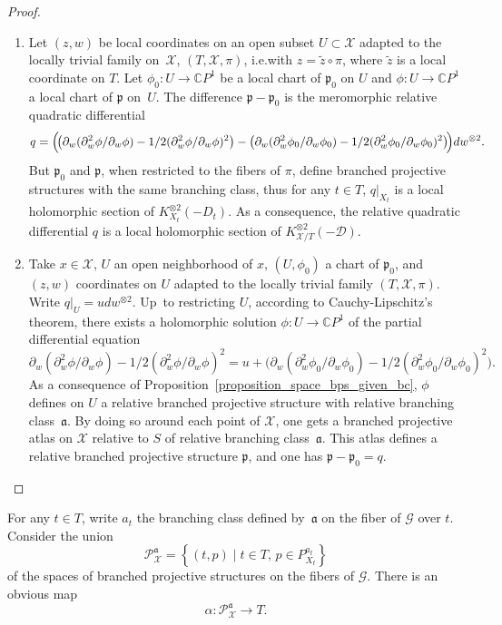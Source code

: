 \documentclass[10pt]{amsart}
\newcommand{\ie}{i.e.}
\newcommand{\skpt}{\par\smallskip}
\newcommand{\CP}{\mathbb CP}
\theoremstyle{definition}
\theoremstyle{plain}
\begin{document}
\skpt
\begin{proof}
\begin{enumerate}
\item
Let $(z, w)$ be local coordinates on an open subset $U \!\subset\! \mathcal X$ adapted to the locally trivial family on~$\mathcal X$, $(T, \mathcal X, \pi)$, \ie with $z = \widetilde z \circ \pi$, where $\widetilde z$ is a local coordinate on $T$. Let \hbox{$\phi_0: U \!\to\! \CP^1$} be a local chart of $\mathfrak p_0$ on $U$ and $\phi: U \to \CP^1$ a local chart of $\mathfrak p$ on~$U$.
The difference $\mathfrak p - \mathfrak p_0$ is the meromorphic relative quadratic differential
\[
q =\Bigl(\!\bigl(\partial_w(\partial^2_w \phi / \partial_w \phi) - 1/2 (\partial^2_w \phi / \partial_w \phi)^2\bigr)
- \bigl(\partial_w(\partial^2_w \phi_0 / \partial_w \phi_0) - 1/2 (\partial^2_w \phi_0 / \partial_w \phi_0)^2\bigr)\!\Bigr)dw^{\otimes 2}.
\]
But $\mathfrak p_0$ and $\mathfrak p$, when restricted to the fibers of $\pi$, define branched projective structures with the same branching class, thus for any $t \in T$, $q|_{X_t}$ is a local holomorphic section of $K_{X_t}^{\otimes 2}(-D_t)$. As a consequence, the relative quadratic differential $q$ is a local holomorphic section of $K_{\mathcal X / T}^{\otimes 2}(-\mathcal D)$.
\item
Take $x \in \mathcal X$, $U$ an open neighborhood of $x$, $(U, \phi_0)$ a chart of $\mathfrak p_0$, and $(z, w)$ coordinates on $U$ adapted to the locally trivial family $(T, \mathcal X, \pi)$.
Write $q|_U = udw^{\otimes 2}$. Up~to restricting $U$, according to Cauchy-Lipschitz's theorem, there exists a holomorphic solution $\phi: U\to \CP^1$ of the partial differential equation
\[
\partial_w(\partial^2_w \phi / \partial_w \phi) - 1/2 (\partial^2_w \phi / \partial_w \phi)^2 = u + \bigl(\partial_w(\partial^2_w \phi_0 / \partial_w \phi_0) - 1/2 (\partial^2_w \phi_0 / \partial_w \phi_0)^2\bigr).
\]
As a consequence of Proposition~\ref{proposition_space_bps_given_bc}, $\phi$ defines on $U$ a relative branched projective structure with relative branching class~$\mathfrak a$.
By doing so around each point of $\mathcal X$, one gets a branched projective atlas on $\mathcal X$ relative to $S$ of relative branching class~$\mathfrak a$.
This atlas defines a relative branched projective structure $\mathfrak p$, and one has $\mathfrak p-\mathfrak p_0 = q$.\qedhere
\end{enumerate}
\end{proof}

For any $t \in T$, write $a_t$ the branching class defined by~$\mathfrak a$ on the fiber of $\mathcal G$ over $t$.
Consider the union\vspace*{-3pt}
\begin{equation}\label{eq_base_univ_family_bps_over_bc}
\mathcal P_{\mathcal X}^{\mathfrak a} = \left \{(t, p)\mid t \in T,\, p \in P_{X_t}^{a_t}\right \}
\end{equation}
of the spaces of branched projective structures on the fibers of $\mathcal G$.
There is an obvious map\vspace*{-3pt}
\begin{equation}\label{eq_proj_bps_bc}
\alpha: \mathcal P_{\mathcal X}^{\mathfrak a} \to T.
\end{equation}
\end{document}
